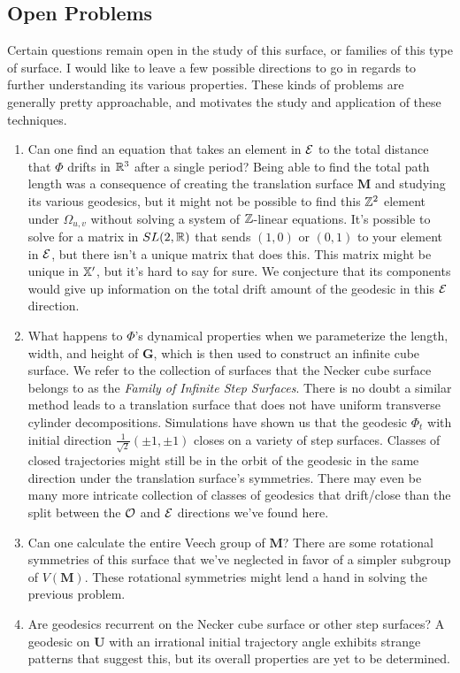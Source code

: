 \documentclass[a4paper, 11pt]{article}
\def\bU{\mathbf{U}} \def\btU{\tilde{\bU}} \def\bUs{\bU^\circ}
\def\bG{\mathbf{G}} \def\bGs{\mathbf{G}^\circ}
\def\bM{\mathbf{M}}
\begin{document}
\subsection{Open Problems}
Certain questions remain open in the study of this surface, or families of this type of surface. I would like to leave a few possible directions to go in regards to further understanding its various properties. These kinds of problems are generally pretty approachable, and motivates the study and application of these techniques.
\begin{enumerate}
\item Can one find an equation that takes an element in $\mathcal{E}$ to the total distance that $\Phi$ drifts in $\mathbb{R}^3$ after a single period? Being able to find the total path length was a consequence of creating the translation surface $\bM$ and studying its various geodesics, but it might not be possible to find this $\mathbb{Z}^2$ element under $\Omega_{u,v}$ without solving a system of $\mathbb{Z}$-linear equations. It's possible to solve for a matrix in $SL(2,\mathbb{R})$ that sends $(1,0)$ or $(0,1)$ to your element in $\mathcal{E}$, but there isn't a unique matrix that does this. This matrix might be unique in $\mathbb{X}'$, but it's hard to say for sure. We conjecture that its components would give up information on the total drift amount of the geodesic in this $\mathcal{E}$ direction.
\item What happens to $\Phi$'s dynamical properties when we parameterize the length, width, and height of $\bG$, which is then used to construct an infinite cube surface. We refer to the collection of surfaces that the Necker cube surface belongs to as the \emph{Family of Infinite Step Surfaces}. There is no doubt a similar method leads to a translation surface that does not have uniform transverse cylinder decompositions. Simulations have shown us that the geodesic $\Phi_t$ with initial direction $\frac{1}{\sqrt{2}}(\pm1,\pm1)$ closes on a variety of step surfaces. Classes of closed trajectories might still be in the orbit of the geodesic in the same direction under the translation surface's symmetries. There may even be many more intricate collection of classes of geodesics that drift/close than the split between the $\mathcal{O}$ and $\mathcal{E}$ directions we've found here.
\item Can one calculate the entire Veech group of $\bM$? There are some rotational symmetries of this surface that we've neglected in favor of a simpler subgroup of $V(\bM)$. These rotational symmetries might lend a hand in solving the previous problem.
\item Are geodesics recurrent on the Necker cube surface or other step surfaces? A geodesic on $\bU$ with an irrational initial trajectory angle exhibits strange patterns that suggest this, but its overall properties are yet to be determined.
\end{enumerate}
\end{document}

